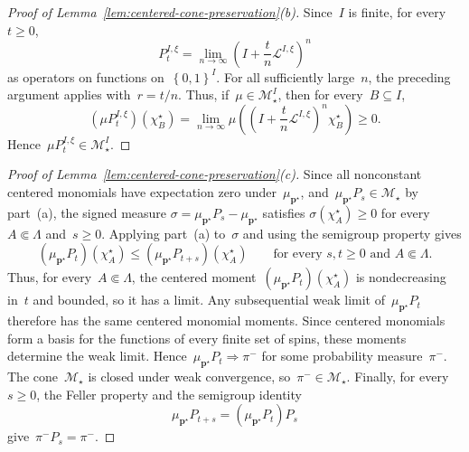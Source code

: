 \documentclass[EJP,preprint,NODS,nobera]{ejpecp}
\newcommand{\bb}[1]{\left(#1\right)}
\newcommand{\cb}[1]{\left\{#1\right\}}
\newcommand{\mb}[1]{\mathbf{#1}}
\newcommand{\Lcal}{\mathcal{L}}
\begin{document}
\begin{proof}[Proof of Lemma~\ref{lem:centered-cone-preservation}\textup{(b)}]
Since~$I$ is finite, for every~$t\geq0$,
\begin{equation*}
P_t^{I,\xi}
=
\lim_{n\to\infty}
\bb{
I+\frac{t}{n}\Lcal^{I,\xi}
}^n
\end{equation*}
as operators on functions on~$\cb{0,1}^I$. For all sufficiently large~$n$,
the preceding argument applies with~$r=t/n$. Thus, if~$\mu\in\mathcal M_\star^I$, then for every~$B\subseteq I$,
\begin{equation*}
(\mu P_t^{I,\xi})(\chi_B^\star)
=
\lim_{n\to\infty}
\mu\bb{
\bb{
I+\frac{t}{n}\Lcal^{I,\xi}
}^n
\chi_B^\star
}
\geq0.
\end{equation*}
Hence~$\mu P_t^{I,\xi}\in\mathcal M_\star^I$.
\end{proof}

\begin{proof}[Proof of Lemma~\ref{lem:centered-cone-preservation}\textup{(c)}]
Since all nonconstant centered monomials have expectation zero
under~$\mu_{\mb p^\star}$, and~$\mu_{\mb p^\star}P_s\in\mathcal M_\star$ by
part~\textup{(a)}, the signed measure
$\sigma=\mu_{\mb p^\star}P_s-\mu_{\mb p^\star}$ satisfies
$\sigma(\chi_A^\star)\geq0$ for every~$A\Subset\Lambda$ and~$s\geq0$.
Applying part~\textup{(a)} to~$\sigma$ and using the
semigroup property gives
\begin{equation*}
(\mu_{\mb p^\star}P_t)(\chi_A^\star)
\leq
(\mu_{\mb p^\star}P_{t+s})(\chi_A^\star)
\qquad
\text{for every }s,t\geq0\text{ and }A\Subset\Lambda.
\end{equation*}
Thus, for every~$A\Subset\Lambda$, the centered moment~$(\mu_{\mb p^\star}P_t)(\chi_A^\star)$ is nondecreasing in~$t$ and bounded,
so it has a limit. Any subsequential weak limit of~$\mu_{\mb p^\star}P_t$ therefore has the same centered monomial moments.
Since centered monomials form a basis for the functions of every finite set of
spins, these moments determine the weak limit. Hence~$\mu_{\mb p^\star}P_t\Rightarrow\pi^-$ for some probability measure~$\pi^-$. The cone~$\mathcal M_\star$ is closed under weak convergence, so~$\pi^-\in\mathcal M_\star$. Finally, for every~$s\geq0$, the Feller
property and the semigroup identity
\begin{equation*}
\mu_{\mb p^\star}P_{t+s}
=
\bb{\mu_{\mb p^\star}P_t}P_s
\end{equation*}
give~$\pi^-P_s=\pi^-$.
\end{proof}
\end{document}
